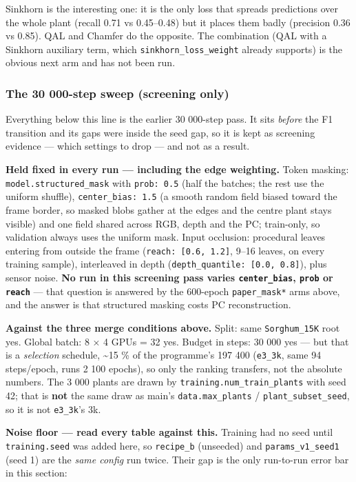 \documentclass[
  10pt,
]{article}
\begin{document}
Sinkhorn is the interesting one: it is the only loss that spreads
predictions over the whole plant (recall 0.71 vs 0.45--0.48) but it
places them badly (precision 0.36 vs 0.85). QAL and Chamfer do the
opposite. The combination (QAL with a Sinkhorn auxiliary term, which
\texttt{sinkhorn\_loss\_weight} already supports) is the obvious next
arm and has not been run.

\subsubsection{The 30 000-step sweep (screening
only)}\label{the-30-000-step-sweep-screening-only}

Everything below this line is the earlier 30 000-step pass. It sits
\emph{before} the F1 transition and its gaps were inside the seed gap,
so it is kept as screening evidence --- which settings to drop --- and
not as a result.

\textbf{Held fixed in every run --- including the edge weighting.} Token
masking: \texttt{model.structured\_mask} with \texttt{prob:\ 0.5} (half
the batches; the rest use the uniform shuffle),
\texttt{center\_bias:\ 1.5} (a smooth random field biased toward the
frame border, so masked blobs gather at the edges and the centre plant
stays visible) and one field shared across RGB, depth and the PC;
train-only, so validation always uses the uniform mask. Input occlusion:
procedural leaves entering from outside the frame
(\texttt{reach:\ {[}0.6,\ 1.2{]}}, 9--16 leaves, on every training
sample), interleaved in depth
(\texttt{depth\_quantile:\ {[}0.0,\ 0.8{]}}), plus sensor noise.
\textbf{No run in this screening pass varies \texttt{center\_bias},
\texttt{prob} or \texttt{reach}} --- that question is answered by the
600-epoch \texttt{paper\_mask*} arms above, and the answer is that
structured masking costs PC reconstruction.

\textbf{Against the three merge conditions above.} Split: same
\texttt{Sorghum\_15K} root yes. Global batch: 8 × 4 GPUs = 32 yes.
Budget in steps: 30 000 yes --- but that is a \emph{selection} schedule,
\textasciitilde15 \% of the programme's 197 400 (\texttt{e3\_3k}, same
94 steps/epoch, runs 2 100 epochs), so only the ranking transfers, not
the absolute numbers. The 3 000 plants are drawn by
\texttt{training.num\_train\_plants} with seed 42; that is \textbf{not}
the same draw as main's \texttt{data.max\_plants} /
\texttt{plant\_subset\_seed}, so it is not \texttt{e3\_3k}'s 3k.

\textbf{Noise floor --- read every table against this.} Training had no
seed until \texttt{training.seed} was added here, so \texttt{recipe\_b}
(unseeded) and \texttt{params\_v1\_seed1} (seed 1) are the \emph{same
config} run twice. Their gap is the only run-to-run error bar in this
section:
\end{document}

